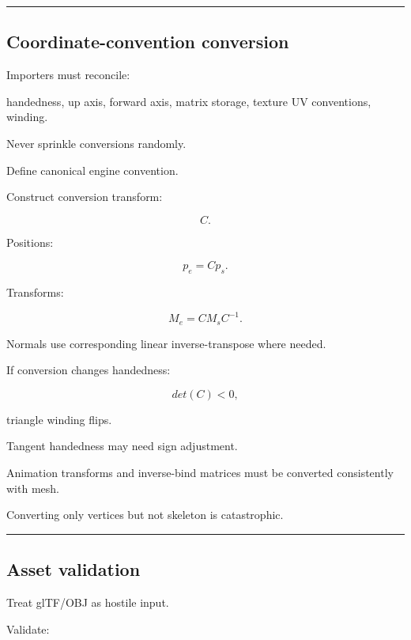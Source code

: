 \begin{center}\rule{0.5\linewidth}{0.5pt}\end{center}

\subsection{Coordinate-convention conversion}\label{04-visual-computing-ii-ch041-coordinate-convention-conversion}

\hypertarget{04-visual-computing-ii-ch041-coordinate-convention-conversion}{}

Importers must reconcile:

handedness, up axis, forward axis, matrix storage, texture UV conventions, winding.

Never sprinkle conversions randomly.

Define canonical engine convention.

Construct conversion transform:

\[
C.
\]

Positions:

\[
p_e=
Cp_s.
\]

Transforms:

\[
\boxed{
M_e=
CM_sC^{-1}.
}
\]

Normals use corresponding linear inverse-transpose where needed.

If conversion changes handedness:

\[
det(C)<0,
\]

triangle winding flips.

Tangent handedness may need sign adjustment.

Animation transforms and inverse-bind matrices must be converted consistently with mesh.

Converting only vertices but not skeleton is catastrophic.

\begin{center}\rule{0.5\linewidth}{0.5pt}\end{center}

\subsection{Asset validation}\label{04-visual-computing-ii-ch041-asset-validation}

\hypertarget{04-visual-computing-ii-ch041-asset-validation}{}

Treat glTF/OBJ as hostile input.

Validate:

